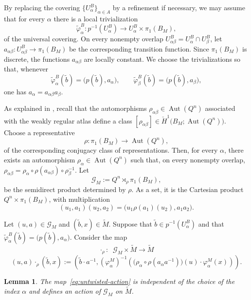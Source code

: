 \documentclass[11pt,a4paper]{article}
\numberwithin{equation}{section}
\newtheorem{lemma}[definition]{Lemma}
\theoremstyle{named}
\begin{document}
By replacing the covering \(\{U_\alpha^B\}_{\alpha\in A}\) by a refinement if necessary, we may assume that for every \(\alpha\) there is a local trivialization
\[
\widetilde\varphi_\alpha^B:
p^{-1}(U_\alpha^B)
\longrightarrow
U_\alpha^B\times\pi_1(B_M),
\]
of the universal covering. On every nonempty overlap $U_{\alpha\beta}^B
=
U_\alpha^B\cap U_\beta^B$,
let $a_{\alpha\beta}:U_{\alpha\beta}^B
\longrightarrow\pi_1(B_M)$
be the corresponding transition function. Since \(\pi_1(B_M)\) is discrete, the functions \(a_{\alpha\beta}\) are locally constant. We choose the trivializations so that, whenever
\[
\widetilde\varphi_\alpha^B(\widetilde b)
=
\bigl(p(\widetilde b),a_\alpha\bigr),
\qquad
\widetilde\varphi_\beta^B(\widetilde b)
=\bigl(p(\widetilde b),a_\beta\bigr),
\]
one has \(a_\alpha=a_{\alpha\beta}a_\beta\).

As explained in \cite{bg25}, recall that the automorphisms $\rho_{\alpha\beta}\in\operatorname{Aut}(Q^n)$
associated with the weakly regular atlas define a class $[{\rho_{\alpha\beta}}]
\in
\check H^1
\bigl(B_M;\operatorname{Aut}(Q^n)\bigr)$.
Choose a representative
\[
\rho:\pi_1(B_M)\longrightarrow\operatorname{Aut}(Q^n),
\]
of the corresponding conjugacy class of representations. Then, for every
\(\alpha\), there exists an automorphism $\rho_\alpha\in\operatorname{Aut}(Q^n)$
such that, on every nonempty overlap, $\rho_{\alpha\beta}
=
\rho_\alpha\circ\rho(a_{\alpha\beta})
\circ\rho_\beta^{-1}$. Let \[\mathcal G_M:=Q^n\rtimes_\rho\pi_1(B_M),\]
be the semidirect product determined by \(\rho\). As a set, it is the Cartesian product $Q^n\times\pi_1(B_M)$,
with multiplication
\[
(u_1,a_1)(u_2,a_2)
=\bigl(u_1\rho(a_1)(u_2),a_1a_2\bigr).
\]

Let $(u,a)\in \mathcal G_M$
and $(\widetilde b,x)\in\widetilde M$.
Suppose that $\widetilde b\in p^{-1}(U_\alpha^B)$
and that $
\widetilde\varphi_\alpha^B(\widetilde b)
=\bigl(p(\widetilde b),a_\alpha\bigr)$.
Consider the map 
\[\cdot_\rho:\;\;\mathcal G_M\times \widetilde M\longrightarrow \widetilde M\]
\begin{equation}
\label{eq:untwisted-action}
(u,a)\cdot_\rho(\widetilde b,x)
:=
\left(
\widetilde b\cdot a^{-1},
(\varphi_\alpha^M)^{-1}
\left(
\bigl(
\rho_\alpha\circ\rho(a_\alpha a^{-1})
\bigr)(u)
\cdot
\varphi_\alpha^M(x)
\right)
\right).
\end{equation}

\begin{lemma}
\label{lem:untwisted-action}
The map~\eqref{eq:untwisted-action} is independent of the choice of the index \(\alpha\) and defines an action of $\mathcal G_M$
on \(\widetilde M\).
\end{lemma}
\end{document}
